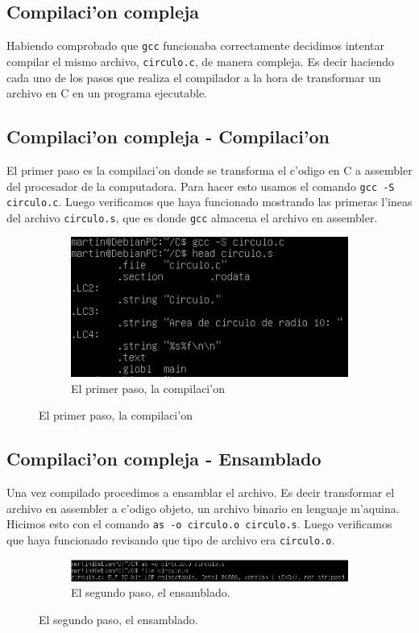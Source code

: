\documentclass[11pt]{article}
\begin{document}
	\subsection{Compilaci'on compleja}
		Habiendo comprobado que \texttt{gcc} funcionaba correctamente decidimos intentar compilar el mismo archivo, \texttt{circulo.c}, de manera compleja. Es decir haciendo cada uno de los pasos que realiza el compilador a la hora de transformar un archivo en C en un programa ejecutable.
		
	\subsection{Compilaci'on compleja - Compilaci'on}
		El primer paso es la compilaci'on donde se transforma el c'odigo en C a assembler del procesador de la computadora. Para hacer esto usamos el comando \texttt{gcc -S circulo.c}. Luego verificamos que haya funcionado mostrando las primeras l'ineas del archivo \texttt{circulo.s}, que es donde \texttt{gcc} almacena el archivo en assembler.

		\begin{figure}[H]
			\centering
			\begin{subfigure}[b!]{0.7\linewidth}
				\includegraphics[width=\linewidth]{Images/Seccion 1/S1 parte tres.PNG}
				\caption*{El primer paso, la compilaci'on}
			\end{subfigure}
		\end{figure}
		
	\subsection{Compilaci'on compleja - Ensamblado}
		Una vez compilado procedimos a ensamblar el archivo. Es decir transformar el archivo en assembler a c'odigo objeto, un archivo binario en lenguaje m'aquina. Hicimos esto con el comando \texttt{as -o circulo.o circulo.s}. Luego verificamos que haya funcionado revisando que tipo de archivo era \texttt{circulo.o}.
		\begin{figure}[H]
			\centering
			\begin{subfigure}[b!]{0.7\linewidth}
				\includegraphics[width=\linewidth]{Images/Seccion 1/S1 parte cuatro.PNG}
				\caption*{El segundo paso, el ensamblado.}
			\end{subfigure}
		\end{figure}
		
\end{document}
